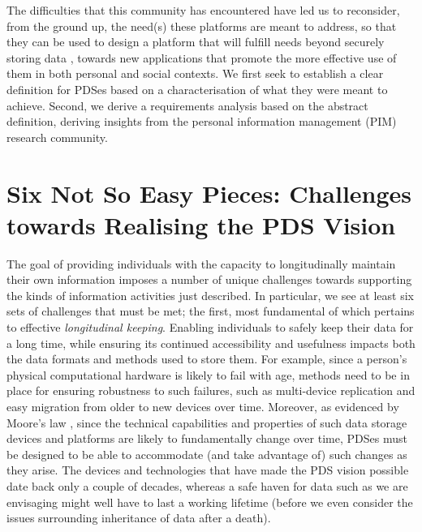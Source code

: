 \documentclass[graybox]{svmult}
\begin{document}

The difficulties that this community has encountered have led us to reconsider, from the ground up, the need(s) these platforms are meant to address, so that they can be used to design a platform that will fulfill needs beyond securely storing data , towards new applications that promote the more effective use of them in both personal and social contexts.  We first seek to establish a clear definition for PDSes based on a characterisation of what they were meant to achieve.  Second, we derive a requirements analysis based on the abstract definition, deriving insights from the personal information management (PIM) research community.


\section{Six Not So Easy Pieces: Challenges towards Realising the PDS Vision}


The goal of providing individuals with the capacity to longitudinally maintain their own information imposes a number of unique challenges towards supporting the kinds of information activities just described.  In particular, we see at least six sets of challenges that must be met; the first, most fundamental of which pertains to effective \emph{longitudinal keeping}.  Enabling individuals to safely keep their data for a long time, while ensuring its continued accessibility and usefulness impacts both the data formats and methods used to store them.  For example, since a person's physical computational hardware is likely to fail with age, methods need to be in place for ensuring robustness to such failures, such as multi-device replication and easy migration from older to new devices over time.   Moreover, as evidenced by Moore's law \cite{gray2000rules}, since the technical capabilities and properties of such data storage devices and platforms are likely to fundamentally change over time, PDSes must be designed to be able to accommodate (and take advantage of) such changes as they arise. The devices and technologies that have made the PDS vision possible date back only a couple of decades, whereas a safe haven for data such as we are envisaging might well have to last a working lifetime (before we even consider the issues surrounding inheritance of data after a death).
\end{document}

